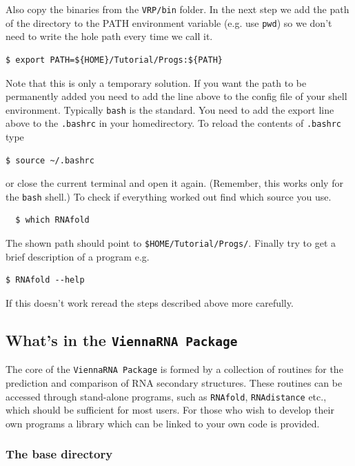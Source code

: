 \documentclass[a4paper]{article}
\newcommand{\frametitle}[1]{\subsubsection{#1}}
\begin{document}
Also copy the binaries from the \texttt{VRP/bin} folder. In the next step we add the path 
of the directory to the PATH environment variable (e.g. use \texttt{pwd}) so we don't need to
write the hole path every time we call it.
\begin{verbatim}
$ export PATH=${HOME}/Tutorial/Progs:${PATH}
\end{verbatim}
%
Note that this is only a temporary solution. If you want the path to be 
permanently added you need to add the line above to the config file of your 
shell environment. Typically \texttt{bash} is the standard. You need to add the export line 
above to the \texttt{.bashrc} in your homedirectory. To reload the contents of \texttt{.bashrc} type
\begin{verbatim}
$ source ~/.bashrc
\end{verbatim}
or close the current terminal and open it again. (Remember, this works only for the \texttt{bash} shell.)
%
To check if everything worked out find which source you use.
%	
\begin{verbatim}
  $ which RNAfold
\end{verbatim}
The shown path should point to \texttt{\$HOME/Tutorial/Progs/}. Finally try to
get a brief description of a program e.g.
%	
\begin{verbatim}
$ RNAfold --help
\end{verbatim}
%
If this doesn't work reread the steps described above more carefully.

\subsection{What's in the \texttt{ViennaRNA Package}}
The core of the \texttt{ViennaRNA Package} is formed by a collection
of routines for the prediction and comparison of RNA secondary
structures. These routines can be accessed through stand-alone
programs, such as \texttt{RNAfold}, \texttt{RNAdistance} etc., which
should be sufficient for most users. For those who wish to develop
their own programs a library which can be linked to your own code is
provided.

  \frametitle{The base directory}
\end{document}
